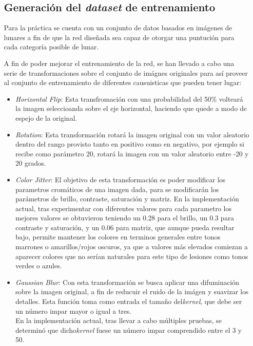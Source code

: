 \subsection{Generación del \textit{dataset} de entrenamiento}

Para la práctica se cuenta con un conjunto de datos basados en imágenes de lunares a fin de que la red diseñada sea capaz de otorgar una puntución para cada categoría posible de lunar.\smallskip

A fin de poder mejorar el entrenamiento de la red, se han llevado a cabo una serie de transformaciones sobre el conjunto de imágnes originales para así proveer al conjunto de entrenamiento de diferentes causuisticas que pueden tener lugar:
\begin{itemize}
    \item \textit{Horizontal Flip}: Esta transfromación con una probabilidad del 50\% volteará la imagen seleccioanda sobre el eje horizontal, haciendo que quede a modo de espejo de la original.
    \item \textit{Rotation}: Esta transformación rotará la imagen original con un valor aleatorio dentro del rango provisto tanto en positivo como en negativo, por ejemplo si recibe como parámetro 20, rotará la imagen con un valor aleatorio entre -20 y 20 grados.
    \item \textit{Color Jitter}: El objetivo de esta transformación es poder modificar los parametros cromáticos de una imagen dada, para se modificarán los parámetros de brillo, contraste, saturación y matriz.
    En la implementación actual, tras experimentar con diferentes valores para cada parametro los mejores valores se obtuvieron teniendo un 0.28 para el brillo, un 0.3 para contraste y saturación, y un 0.06 para matriz,
    que aunque pueda resultar bajo, permite mantener los colores en terminos generales entre tonos marrones o amarillos/rojos oscuros, ya que a valores más elevados comiezan a aparecer colores que no serían naturales para este tipo de lesiones como tonos verdes o azules.
    \item \textit{Gaussian Blur}: Con esta transformación se busca aplicar una difuminación sobre la imagen original, a fin de reducuir el ruido de la imágen y suavizar los detalles. Esta función toma como entrada el tamaño del\textit{kernel}, que debe ser un número impar mayor o igual a tres.\\
    En la implementación actual, tras llevar a cabo múltiples pruebas, se determinó que dicho\textit{kernel} fuese un número impar comprendido entre el 3 y 50.
\end{itemize}

